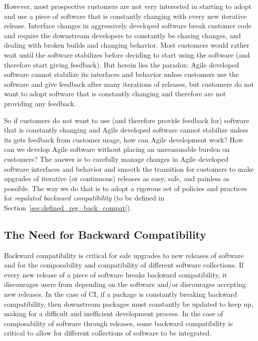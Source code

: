\documentclass[11pt]{SANDreport}
\begin{document}
However, most prospective customers are not very interested in starting to adopt and use a piece of software that is constantly changing with every new iterative release.  Interface changes in aggressively developed software break customer code and require the downstream developers to constantly be chasing changes, and dealing with broken builds and changing behavior.  Most customers would rather wait until the software stabilizes before deciding to start using the software (and therefore start giving feedback).  But herein lies the paradox: Agile developed software cannot stabilize its interfaces and behavior unless customers use the software and give feedback after many iterations of releases, but customers do not want to adopt software that is constantly changing and therefore are not providing any feedback.

So if customers do not want to use (and therefore provide feedback for) software that is constantly changing and Agile developed software cannot stabilize unless its gets feedback from customer usage, how can Agile development work?  How can we develop Agile software without placing an unreasonable burden on customers?  The answer is to carefully manage changes in Agile developed software interfaces and behavior and smooth the transition for customers to make upgrades of iterative (or continuous) releases as easy, safe, and painless as possible.  The way we do that is to adopt a rigorous set of policies and practices for {}\textit{regulated backward compatibility} (to be defined in Section~\ref{sec:defined_reg_back_compat}).


%
{}\subsection{The Need for Backward Compatibility}
\label{sec:need_for_back_compat}
%

Backward compatibility is critical for safe upgrades to new releases of software and for the composability and compatibility of different software collections.  If every new release of a piece of software breaks backward compatibility, it discourages users from depending on the software and/or discourages accepting new releases.  In the case of CI, if a package is constantly breaking backward compatibility, then downstream packages must constantly be updated to keep up, making for a difficult and inefficient development process.  In the case of composability of software through releases, some backward compatibility is critical to allow for different collections of software to be integrated.
\end{document}
